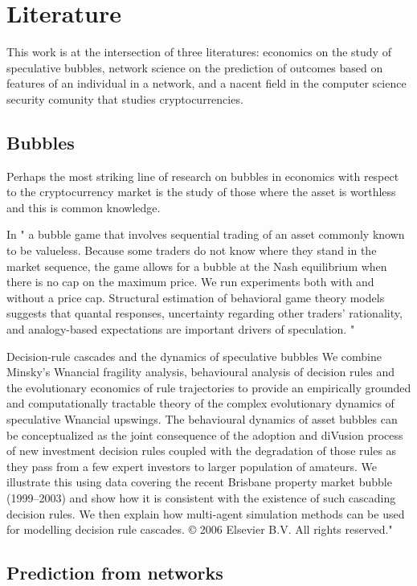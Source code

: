 \section{Literature}

This work is at the intersection of three literatures: economics on the study of speculative bubbles, network science on the prediction of outcomes based on features of an individual in a network, and a nacent field in the computer science security comunity that studies cryptocurrencies.


\subsection{Bubbles}

Perhaps the most striking line of research on bubbles in economics with respect to the cryptocurrency market is the study of those where the asset is worthless and this is common knowledge. 

In \cite{} " a bubble game that involves sequential trading of an
asset commonly known to be valueless. Because some traders do not
know where they stand in the market sequence, the game allows for
a bubble at the Nash equilibrium when there is no cap on the maximum
price. We run experiments both with and without a price cap.
Structural estimation of behavioral game theory models suggests that
quantal responses, uncertainty regarding other traders’ rationality,
and analogy-based expectations are important drivers of speculation. "


Decision-rule cascades and the dynamics of speculative bubbles
We combine Minsky’s Wnancial fragility analysis, behavioural analysis of decision rules and the
evolutionary economics of rule trajectories to provide an empirically grounded and computationally
tractable theory of the complex evolutionary dynamics of speculative Wnancial upswings. The behavioural
dynamics of asset bubbles can be conceptualized as the joint consequence of the adoption and
diVusion process of new investment decision rules coupled with the degradation of those rules as they
pass from a few expert investors to larger population of amateurs. We illustrate this using data covering
the recent Brisbane property market bubble (1999–2003) and show how it is consistent with the
existence of such cascading decision rules. We then explain how multi-agent simulation methods can
be used for modelling decision rule cascades.
© 2006 Elsevier B.V. All rights reserved."

\subsection{Prediction from networks}

